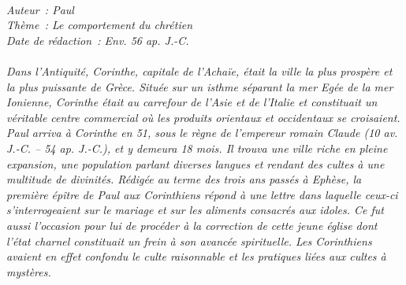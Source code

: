 \BFont
\noindent\hrulefill
{\footnotesize
\textit{
\bigskip
{\centering{}
\\Auteur~: Paul
\\Thème~: Le comportement du chrétien
\\Date de rédaction~: Env. 56 ap. J.-C.\\}
}
\textit{
\\Dans l'Antiquité, Corinthe, capitale de l'Achaïe, était la ville la plus prospère et la plus puissante de Grèce. Située sur un isthme séparant la mer Egée de la mer Ionienne, Corinthe était au carrefour de l'Asie et de l'Italie et constituait un véritable centre commercial où les produits orientaux et occidentaux se croisaient.
\\Paul arriva à Corinthe en 51, sous le règne de l'empereur romain Claude (10 av. J.-C. – 54 ap. J.-C.), et y demeura 18 mois. Il trouva une ville riche en pleine expansion, une population parlant diverses langues et rendant des cultes à une multitude de divinités. Rédigée au terme des trois ans passés à Ephèse, la première épître de Paul aux Corinthiens répond à une lettre dans laquelle ceux-ci s'interrogeaient sur le mariage et sur les aliments consacrés aux idoles. Ce fut aussi l'occasion pour lui de procéder à la correction de cette jeune église dont l'état charnel constituait un frein à son avancée spirituelle. Les Corinthiens avaient en effet confondu le culte raisonnable et les pratiques liées aux cultes à mystères.\bigskip
}
}
\par\nobreak\noindent\hrulefill
